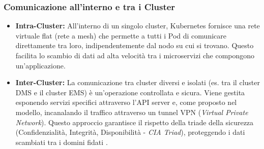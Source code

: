 \subsubsection{Comunicazione all'interno e tra i Cluster}

\begin{itemize}
    \item \textbf{Intra-Cluster:} All'interno di un singolo cluster, Kubernetes fornisce una rete virtuale flat (rete a mesh) che permette a tutti i Pod di comunicare direttamente tra loro, indipendentemente dal nodo su cui si trovano. Questo facilita lo scambio di dati ad alta velocità tra i microservizi che compongono un'applicazione.
    \item \textbf{Inter-Cluster:} La comunicazione tra cluster diversi e isolati (es. tra il cluster DMS e il cluster EMS) è un'operazione controllata e sicura. Viene gestita esponendo servizi specifici attraverso l'API server e, come proposto nel modello, incanalando il traffico attraverso un tunnel VPN (\textit{Virtual Private Network}). Questo approccio garantisce il rispetto della triade della sicurezza (Confidenzialità, Integrità, Disponibilità - \textit{CIA Triad}), proteggendo i dati scambiati tra i domini fidati \cite{cia-triad}.
\end{itemize}
